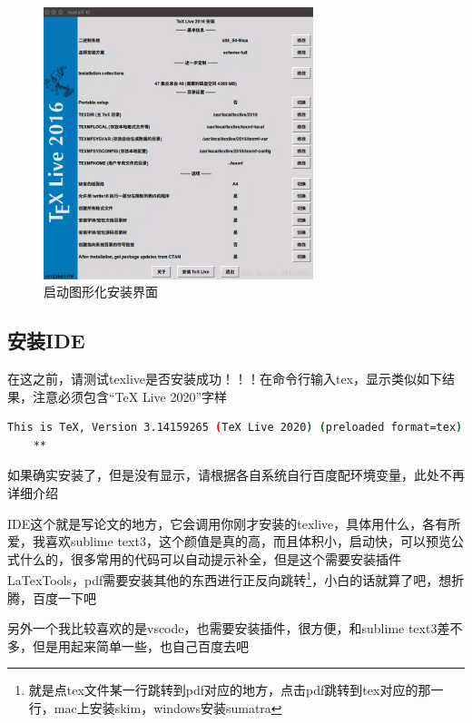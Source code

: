 \documentclass{LZUThesis}
\begin{document}
\begin{figure}[H]
    \centering
    \includegraphics[width=0.7\textwidth]{figures/install_texlive.png}
    \caption{启动图形化安装界面}
    \label{fig_install_texlive}
\end{figure}





\subsection{安装IDE} %
\label{sub:安装ide}

在这之前，请测试texlive是否安装成功！！！在命令行输入tex，显示类似如下结果，注意必须包含“TeX Live 2020”字样

\begin{lstlisting}[language=bash]
    This is TeX, Version 3.14159265 (TeX Live 2020) (preloaded format=tex)
    **
\end{lstlisting}


如果确实安装了，但是没有显示，请根据各自系统自行百度配环境变量，此处不再详细介绍


IDE这个就是写论文的地方，它会调用你刚才安装的texlive，具体用什么，各有所爱，我喜欢sublime text3，这个颜值是真的高，而且体积小，启动快，可以预览公式什么的，很多常用的代码可以自动提示补全，但是这个需要安装插件LaTexTools，pdf需要安装其他的东西进行正反向跳转\footnote{就是点tex文件某一行跳转到pdf对应的地方，点击pdf跳转到tex对应的那一行，mac上安装skim，windows安装sumatra}，小白的话就算了吧，想折腾，百度一下吧


另外一个我比较喜欢的是vscode，也需要安装插件，很方便，和sublime text3差不多，但是用起来简单一些，也自己百度去吧
\end{document}
